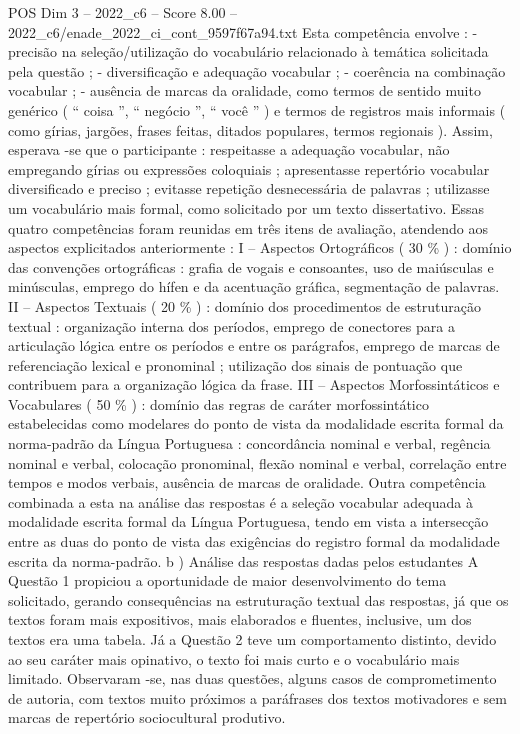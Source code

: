 \begin{textsample}{POS Dim 3 – 2022\_c6 – Score 8.00 – 2022\_c6/enade\_2022\_ci\_cont\_9597f67a94.txt}
Esta competência envolve : - precisão na seleção/utilização do vocabulário relacionado à temática solicitada pela questão ; - diversificação e adequação vocabular ; - coerência na combinação vocabular ; - ausência de marcas da oralidade, como termos de sentido muito genérico ( “ coisa ”, “ negócio ”, “ você ” ) e termos de registros mais informais ( como gírias, jargões, frases feitas, ditados populares, termos regionais ).
Assim, esperava -se que o participante : respeitasse a adequação vocabular, não empregando gírias ou expressões coloquiais ; apresentasse repertório vocabular diversificado e preciso ; evitasse repetição desnecessária de palavras ; utilizasse um vocabulário mais formal, como solicitado por um texto dissertativo.
Essas quatro competências foram reunidas em três itens de avaliação, atendendo aos aspectos explicitados anteriormente : I – Aspectos Ortográficos ( 30 \% ) : domínio das convenções ortográficas : grafia de vogais e consoantes, uso de maiúsculas e minúsculas, emprego do hífen e da acentuação gráfica, segmentação de palavras.
II – Aspectos Textuais ( 20 \% ) : domínio dos procedimentos de estruturação textual : organização interna dos períodos, emprego de conectores para a articulação lógica entre os períodos e entre os parágrafos, emprego de marcas de referenciação lexical e pronominal ; utilização dos sinais de pontuação que contribuem para a organização lógica da frase.
III – Aspectos Morfossintáticos e Vocabulares ( 50 \% ) : domínio das regras de caráter morfossintático estabelecidas como modelares do ponto de vista da modalidade escrita formal da norma-padrão da Língua Portuguesa : concordância nominal e verbal, regência nominal e verbal, colocação pronominal, flexão nominal e verbal, correlação entre tempos e modos verbais, ausência de marcas de oralidade.
Outra competência combinada a esta na análise das respostas é a seleção vocabular adequada à modalidade escrita formal da Língua Portuguesa, tendo em vista a intersecção entre as duas do ponto de vista das exigências do registro formal da modalidade escrita da norma-padrão. b ) Análise das respostas dadas pelos estudantes A Questão 1 propiciou a oportunidade de maior desenvolvimento do tema solicitado, gerando consequências na estruturação textual das respostas, já que os textos foram mais expositivos, mais elaborados e fluentes, inclusive, um dos textos era uma tabela.
Já a Questão 2 teve um comportamento distinto, devido ao seu caráter mais opinativo, o texto foi mais curto e o vocabulário mais limitado.
Observaram -se, nas duas questões, alguns casos de comprometimento de autoria, com textos muito próximos a paráfrases dos textos motivadores e sem marcas de repertório sociocultural produtivo.

\end{textsample}
